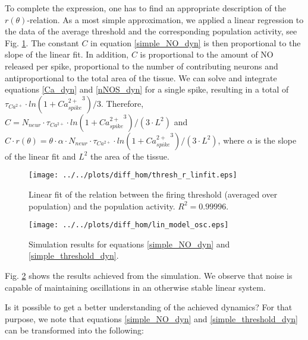 \documentclass[10pt,a4paper]{article}
\begin{document}
To complete the expression, one has to find an appropriate description of the $r(\theta)$-relation. As a most simple approximation, we applied a linear regression to the data of the average threshold and the corresponding population activity, see Fig. \ref{thresh_r_linfit}. The constant $C$ in equation \eqref{simple_NO_dyn} is then proportional to the slope of the linear fit. In addition, $C$ is proportional to the amount of NO released per spike, proportional to the number of contributing neurons and antiproportional to the total area of the tissue. We can solve and integrate equations \eqref{Ca_dyn} and \eqref{nNOS_dyn} for a single spike, resulting in a total of $\tau_{Ca^{2+}}\cdot ln(1+{Ca^{2+}_{spike}}^3) / 3$. Therefore, $C=N_{neur}\cdot \tau_{Ca^{2+}}\cdot ln(1+{Ca^{2+}_{spike}}^3) / (3\cdot L^2)$ and $C\cdot r(\theta)=\theta \cdot \alpha \cdot N_{neur} \cdot \tau_{Ca^{2+}}\cdot ln(1+{Ca^{2+}_{spike}}^3) / (3\cdot L^2)$, where $\alpha$ is the slope of the linear fit and $L^2$ the area of the tissue.
\begin{figure}
\texttt{[image: ../../plots/diff\_hom/thresh\_r\_linfit.eps]}
\caption{Linear fit of the relation between the firing threshold (averaged over population) and the population activity. $R^2=0.99996$.}
\label{thresh_r_linfit}
\end{figure}
\begin{figure}
\texttt{[image: ../../plots/diff\_hom/lin\_model\_osc.eps]}
\caption{Simulation results for equations \eqref{simple_NO_dyn} and \eqref{simple_threshold_dyn}.}
\label{lin_mod_osc}
\end{figure}
Fig. \ref{lin_mod_osc} shows the results achieved from the simulation. We observe that noise is capable of maintaining oscillations in an otherwise stable linear system.

Is it possible to get a better understanding of the achieved dynamics? For that purpose, we note that equations \eqref{simple_NO_dyn} and \eqref{simple_threshold_dyn} can be transformed into the following:
\end{document}
